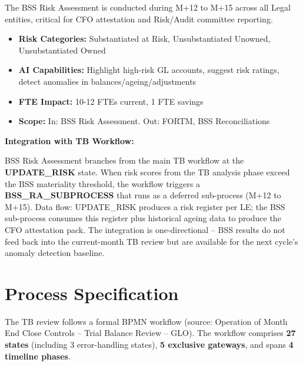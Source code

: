 \documentclass[11pt,a4paper]{article}
\begin{document}
The BSS Risk Assessment is conducted during M+12 to M+15 across all Legal entities, 
critical for CFO attestation and Risk/Audit committee reporting.

\begin{itemize}[noitemsep]
    \item \textbf{Risk Categories:} Substantiated at Risk, Unsubstantiated Unowned, Unsubstantiated Owned
    \item \textbf{AI Capabilities:} Highlight high-risk GL accounts, suggest risk ratings, detect anomalies in balances/ageing/adjustments
    \item \textbf{FTE Impact:} 10-12 FTEs current, 1 FTE savings
    \item \textbf{Scope:} In: BSS Risk Assessment. Out: FORTM, BSS Reconciliations
\end{itemize}

\textbf{Integration with TB Workflow:}

BSS Risk Assessment branches from the main TB workflow at the \textbf{UPDATE\_RISK} state. 
When risk scores from the TB analysis phase exceed the BSS materiality threshold, 
the workflow triggers a \textbf{BSS\_RA\_SUBPROCESS} that runs as a deferred sub-process 
(M+12 to M+15). Data flow: UPDATE\_RISK produces a risk register per LE; the BSS sub-process 
consumes this register plus historical ageing data to produce the CFO attestation pack. 
The integration is one-directional -- BSS results do not feed back into the current-month 
TB review but are available for the next cycle's anomaly detection baseline.


\newpage
\section{Process Specification}

The TB review follows a formal BPMN workflow (source: Operation of Month End Close Controls -- 
Trial Balance Review -- GLO). The workflow comprises \textbf{27 states} (including 3 error-handling states), 
\textbf{5 exclusive gateways}, and spans \textbf{4 timeline phases}.
\end{document}
